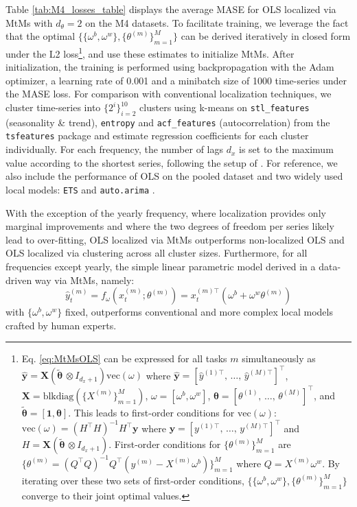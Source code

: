 \documentclass[3p,times,twocolumn]{elsarticle}
\begin{document}
Table \ref{tab:M4_losses_table} displays the average MASE for OLS localized via MtMs with $d_{\theta}=2$ on the M4 datasets.
To facilitate training, we leverage the fact that the optimal $\{\{\omega^{b}, \omega^{w}\}, \{\theta^{(m)}\}_{m=1}^{M}\}$ can be derived iteratively in closed form under the L2 loss\footnote{
    Eq. \ref{eq:MtMsOLS} can be expressed for all tasks $m$ simultaneously as  $\hat{\mathbf{y}}= \mathbf{X}(\tilde{\boldsymbol\theta} \,\otimes I_{d_{x}+1}) \textrm{vec}(\omega)$ where  $\hat{\mathbf{y}}=\left[\hat{y}^{(1)\top},\,\ldots,\,\hat{y}^{(M)\top}\right]^{\top}$, $\mathbf{X}=\textrm{blkdiag}(\{X^{(m)}\}_{m=1}^{M})$, $\omega = [\omega^{b}, \omega^{w}]$, $\boldsymbol\theta = \left[\theta^{(1)},\,\ldots,\,\theta^{(M)}\right]^{\top}$, and $\tilde{\boldsymbol\theta} = [\mathbf{1}, \boldsymbol\theta]$.
    This leads to first-order conditions for $\textrm{vec}(\omega)$: $\textrm{vec}(\omega)=\left(H^{\top}H\right)^{-1}H^{\top}\mathbf{y}$ where $\mathbf{y}=\left[y^{(1)\top},\,\ldots,\,y^{(M)\top}\right]^{\top}$ and $H=\mathbf{X}(\tilde{\boldsymbol\theta} \,\otimes I_{d_{x}+1})$.
    First-order conditions for $\{\theta^{(m)}\}_{m=1}^{M}$ are $\{\theta^{(m)}= \left(Q^{\top}Q\right)^{-1}Q^{\top}(y^{(m)}-X^{(m)}\omega^{b})\}_{m=1}^{M}$ where $Q = X^{(m)}\omega^{w}$.
    By iterating over these two sets of first-order conditions, $\{\{\omega^{b}, \omega^{w}\},\{\theta^{(m)}\}_{m=1}^{M}\}$ converge to their joint optimal values.
}, and use these estimates to initialize MtMs.
After initialization, the training is performed using backpropagation with the Adam optimizer, a learning rate of 0.001 and a minibatch size of 1000 time-series under the MASE loss.
For comparison with conventional localization techniques, we cluster time-series into $\{2^{i}\}_{i=2}^{10}$ clusters using k-means on \texttt{stl\_features} (seasonality \& trend), \texttt{entropy} and \texttt{acf\_features} (autocorrelation) from the \texttt{tsfeatures} package \citep{hyndmanTsfeaturesTimeSeries2023} and estimate regression coefficients for each cluster individually.
For each frequency, the number of lags $d_{x}$ is set to the maximum value according to the shortest series, following the setup of \citet{montero-mansoPrinciplesAlgorithmsForecasting2021}.
For reference, we also include the performance of OLS on the pooled dataset and two widely used local models: \texttt{ETS} \citep{hyndmanStateSpaceFramework2002a} and \texttt{auto.arima} \citep{hyndmanAutomaticTimeSeries2008a}.

With the exception of the yearly frequency, where localization provides only marginal improvements and where the two degrees of freedom per series likely lead to over-fitting, OLS localized via MtMs outperforms non-localized OLS and OLS localized via clustering across all cluster sizes.
Furthermore, for all frequencies except yearly, the simple linear parametric model derived in a data-driven way via MtMs, namely:
\begin{equation}
    \hat{y}_{t}^{(m)}=f_{\omega}(x_{t}^{(m)}; \theta^{(m)})=x_{t}^{(m)\top}(\omega^{b}+\omega^{w}\theta^{(m)})   
\end{equation}
with $\{\omega^{b}, \omega^{w}\}$ fixed, outperforms conventional and more complex local models crafted by human experts.
\end{document}
